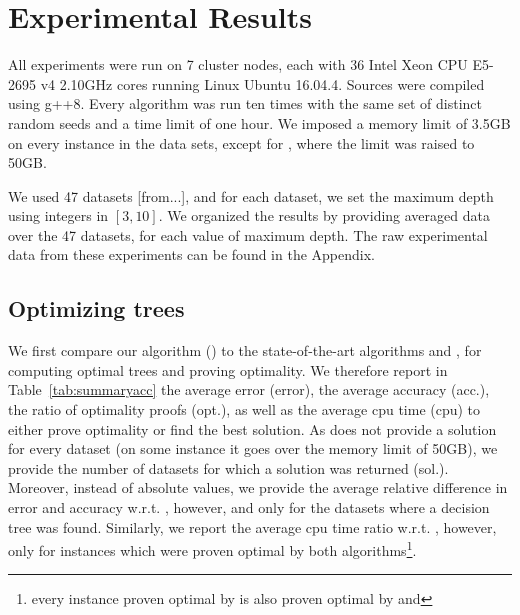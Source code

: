 \documentclass{llncs}
\begin{document}
\section{Experimental Results}

All experiments were run
on 7 cluster nodes, each with 36 Intel Xeon CPU E5-2695 v4 2.10GHz cores
running Linux Ubuntu 16.04.4. Sources were compiled using g++8. 
Every algorithm was run ten times with the same set of distinct random seeds and a time limit of one hour. We imposed a memory limit of 3.5GB on every instance in the data sets, except for \dleight, where the limit was raised to 50GB.

We used 47 datasets [from...], and for each dataset, we set the maximum depth using integers in $[3,10]$. We organized the results by providing averaged data over the 47 datasets, for each value of maximum depth.
The raw experimental data from these experiments can be found in the Appendix.



\subsection{Optimizing trees}

We first compare our algorithm (\budalg) to the state-of-the-art algorithms \murtree and \dleight, for computing optimal trees and proving optimality. We therefore report in Table~\ref{tab:summaryacc} the average error (error), the average accuracy (acc.), 
the ratio of optimality proofs (opt.), as well as the average cpu time (cpu) to either prove optimality or find the best solution.
As \dleight does not provide a solution for every dataset (on some instance it goes over the memory limit of 50GB), we provide the number of datasets for which a solution was returned (sol.). Moreover, 
instead of absolute values, we provide the average relative difference in error and accuracy w.r.t. \budalg, however, and only for the datasets where a decision tree was found. Similarly, we report the average cpu time ratio w.r.t. \budalg, however, only for instances which were proven optimal by both algorithms\footnote{every instance proven optimal by \dleight is also proven optimal by \budalg and \murtree}.


%
%
%
\end{document}
